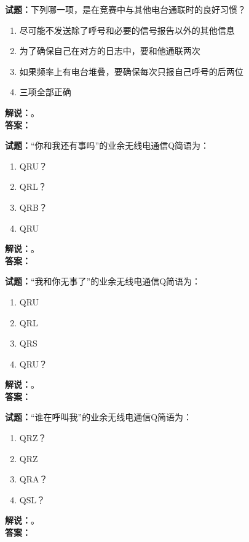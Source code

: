 \documentclass{ctexbook}
\begin{document}
\bigskip




\noindent\textbf{试题：}下列哪一项，是在竞赛中与其他电台通联时的良好习惯？
\begin{enumerate}[leftmargin=3em]
\item 尽可能不发送除了呼号和必要的信号报告以外的其他信息
\item 为了确保自己在对方的日志中，要和他通联两次
\item 如果频率上有电台堆叠，要确保每次只报自己呼号的后两位
\item 三项全部正确
\end{enumerate}
\noindent\textbf{解说：}\textbf{}。\\\noindent\textbf{答案：}

\bigskip




\noindent\textbf{试题：}“你和我还有事吗”的业余无线电通信Q简语为：
\begin{enumerate}[leftmargin=3em]
\item QRU？
\item QRL？
\item QRB？
\item QRU
\end{enumerate}
\noindent\textbf{解说：}\textbf{}。\\\noindent\textbf{答案：}

\bigskip




\noindent\textbf{试题：}“我和你无事了”的业余无线电通信Q简语为：
\begin{enumerate}[leftmargin=3em]
\item QRU
\item QRL
\item QRS
\item QRU？
\end{enumerate}
\noindent\textbf{解说：}\textbf{}。\\\noindent\textbf{答案：}

\bigskip




\noindent\textbf{试题：}“谁在呼叫我”的业余无线电通信Q简语为：
\begin{enumerate}[leftmargin=3em]
\item QRZ？
\item QRZ
\item QRA？
\item QSL？
\end{enumerate}
\noindent\textbf{解说：}\textbf{}。\\\noindent\textbf{答案：}
\end{document}

